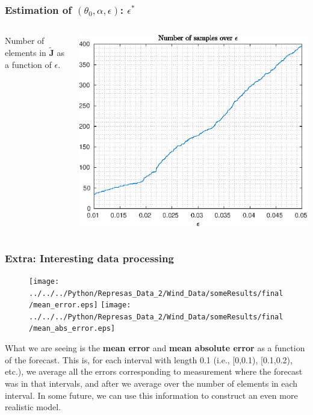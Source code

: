 \documentclass[aspectratio=169]{beamer}\usepackage[utf8]{inputenc}
\begin{document}
\begin{frame}\frametitle{Estimation of $(\theta_0,\alpha,\epsilon)$: $\epsilon^*$}

\begin{columns}

Number of elements in $\tilde{\mathbf{J}}$ as a function of $\epsilon$.

\includegraphics[width=1\textwidth]{../../MATLAB_Files/Results/epsilon/num_over_eps.eps}
\end{columns}

\end{frame}


\begin{frame}\frametitle{Extra: Interesting data processing}

\begin{figure}[ht!]
\centering
\texttt{[image: ../../../Python/Represas\_Data\_2/Wind\_Data/someResults/final/mean\_error.eps]}\quad\quad
\texttt{[image: ../../../Python/Represas\_Data\_2/Wind\_Data/someResults/final/mean\_abs\_error.eps]}
\end{figure}
{\small What we are seeing is the \textbf{mean error} and \textbf{mean absolute error} as a function of the forecast. This is, for each interval with length 0.1 (i.e., [0,0.1), [0.1,0.2), etc.), we average all the errors corresponding to measurement where the forecast was in that intervals, and after we average over the number of elements in each interval. \alert{In some future, we can use this information to construct an even more realistic model.}}

\end{frame}
\end{document}
